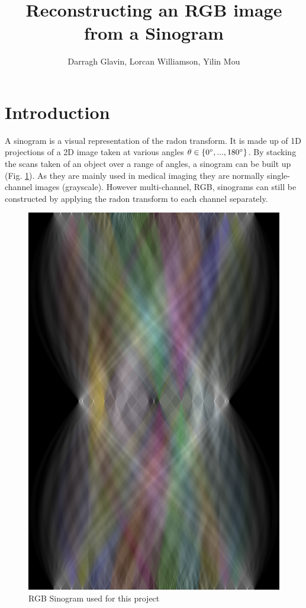 \documentclass[12pt, a4paper]{article}
\begin{document}
\title{Reconstructing an RGB image from a Sinogram}
\author{Darragh Glavin, Lorcan Williamson, Yilin Mou}
\maketitle


\section*{Introduction}
	A sinogram is a visual representation of the radon transform. It is made up of 1D projections of a 2D image taken at various angles $\theta \in \{0\degree, ..., 180\degree\}$. By stacking the scans taken of an object over a range of angles, a sinogram can be built up (Fig. \ref{fig:sinogram}). As they are mainly used in medical imaging they are normally single-channel images (grayscale). However multi-channel, RGB, sinograms can still be constructed by applying the radon transform to each channel separately.
	
	\begin{figure}[h]
		\centering
		\includegraphics[height=0.4\textheight]{../sinogram.png}
		\caption{RGB Sinogram used for this project}
		\label{fig:sinogram}
	\end{figure}
	
\end{document}
